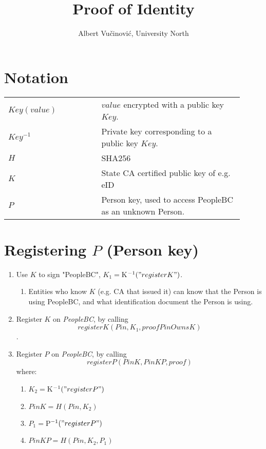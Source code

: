 \documentclass{article}
\title{Proof of Identity}
\author{Albert Vučinović, University North}
\newcommand{\khk}{$P$}
\newcommand{\kid}{$K$}
\newcommand{\pbc}{\textit{PeopleBC}}
\begin{document}
\maketitle
\section{Notation}
\begin{tabular}{p{0.36\linewidth}|p{0.55\linewidth}}
	$Key(value)$ & $value$ encrypted with a public key $Key$. \\
	$Key^{-1}$ & Private key corresponding to a public key $Key$. \\
  $H$ & SHA256 \\
	\kid &  State CA certified public key of e.g. eID\\
  \khk & Person key, used to access PeopleBC as an unknown Person. \\
\end{tabular}

\newpage
\section{Registering \khk{} (Person key)}
\begin{enumerate}
  \item Use \kid{} to sign "PeopleBC", $K_1 = \kid^{-1}("registerK")$.
  \begin{enumerate}
    \item Entities who know \kid{} (e.g. CA that issued it) can know that the Person is using PeopleBC, and what identification document the Person is using.
  \end{enumerate}
  \item Register \kid{} on \pbc, by calling 
    $$registerK(Pin, K_1, proofPinOwnsK)$$.
  \item Register \khk{} on \pbc, by calling 
    $$registerP(PinK, PinKP, proof)$$
  where:
    \begin{enumerate}
      \item $K_2=\kid^{-1}("registerP")$
      \item $PinK=H(Pin,K_2)$
      \item $P_1 = \khk^{-1}("registerP")$
      \item $PinKP=H(Pin, K_2, P_1)$
    \end{enumerate}
\end{enumerate}

\newpage
\end{document}
